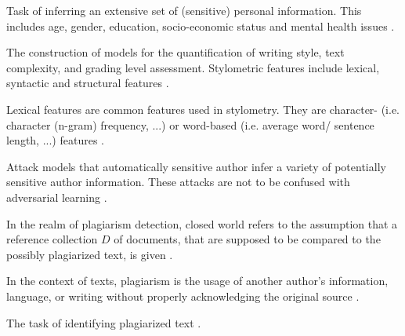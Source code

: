 \begin{definition}
    Task of inferring an extensive set of (sensitive) personal information.
    This includes age, gender, education, socio-economic status and mental health issues \cite{emmery_adversarial_2021}.
\end{definition}

\begin{definition}
    [Stylometry]
    The construction of models for the quantification of writing style, text complexity, and grading level assessment.
    Stylometric features include lexical, syntactic and structural features \cite{stein_intrinsic_2011}.
\end{definition}

\begin{definition}
    Lexical features are common features used in stylometry.
    They are character- (i.e. character (n-gram) frequency, ...) or word-based (i.e. average word/ sentence length, ...) features \cite{stein_intrinsic_2011}. 
\end{definition}

\begin{definition}
    Attack models that automatically sensitive author infer a variety of potentially sensitive author information.
    These attacks are not to be confused with adversarial learning \cite{emmery_adversarial_2021}.
\end{definition}

\begin{definition}
    In the realm of plagiarism detection, closed world refers to the assumption that a reference collection $D$ of documents, that are supposed to be compared to the possibly plagiarized text, is given \cite{stein_intrinsic_2011}.
\end{definition}

\begin{definition}
    [Plagiarism]
    In the context of texts, plagiarism is the usage of another author's information, language, or writing without properly acknowledging the original source \cite{stein_intrinsic_2011}.
\end{definition}

\begin{definition}
    The task of identifying plagiarized text \cite{stein_intrinsic_2011}.
\end{definition}

